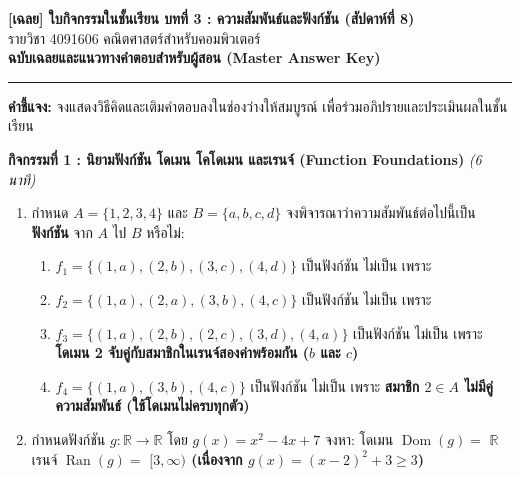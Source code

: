 \documentclass[a4paper,12pt]{article}
\newcommand{\ans}[1]{\textbf{\color{ans}#1}}
\begin{document}
\noindent
\begin{minipage}[c]{0.78\textwidth}
  {\Large\bfseries\color{navy} [เฉลย] ใบกิจกรรมในชั้นเรียน บทที่ 3 : ความสัมพันธ์และฟังก์ชัน (สัปดาห์ที่ 8)}\\[0.1em]
  {\normalsize รายวิชา 4091606 คณิตศาสตร์สำหรับคอมพิวเตอร์}\\[0.5em]
  {\bfseries\color{ans} ฉบับเฉลยและแนวทางคำตอบสำหรับผู้สอน (Master Answer Key)}
\end{minipage}\hfill
\begin{minipage}[c]{0.2\textwidth}
  \centering
\end{minipage}
\par\vspace{0.3em}\hrule\vspace{0.4em}

\noindent\textbf{คำชี้แจง:} จงแสดงวิธีคิดและเติมคำตอบลงในช่องว่างให้สมบูรณ์ เพื่อร่วมอภิปรายและประเมินผลในชั้นเรียน
\vspace{0.3em}

\noindent\textbf{กิจกรรมที่ 1 : นิยามฟังก์ชัน โดเมน โคโดเมน และเรนจ์ (Function Foundations)} \hfill \textit{(6 นาที)}
\begin{enumerate}[label=\arabic*)]
  \item กำหนด $A = \{1, 2, 3, 4\}$ และ $B = \{a, b, c, d\}$ จงพิจารณาว่าความสัมพันธ์ต่อไปนี้เป็น \textbf{ฟังก์ชัน} จาก $A$ ไป $B$ หรือไม่:
        \begin{enumerate}[label=(\alph*),itemsep=1pt]
          \item $f_1 = \{(1, a), (2, b), (3, c), (4, d)\}$ \quad [\ans{\checkmark}] เป็นฟังก์ชัน \quad [ \ ] ไม่เป็น เพราะ \makebox[4cm]{\dotfill}
          \item $f_2 = \{(1, a), (2, a), (3, b), (4, c)\}$ \quad [\ans{\checkmark}] เป็นฟังก์ชัน \quad [ \ ] ไม่เป็น เพราะ \makebox[4cm]{\dotfill}
          \item $f_3 = \{(1, a), (2, b), (2, c), (3, d), (4, a)\}$ \quad [ \ ] เป็นฟังก์ชัน \quad [\ans{\checkmark}] ไม่เป็น เพราะ \ans{โดเมน 2 จับคู่กับสมาชิกในเรนจ์สองค่าพร้อมกัน ($b$ และ $c$)}
          \item $f_4 = \{(1, a), (3, b), (4, c)\}$ \quad [ \ ] เป็นฟังก์ชัน \quad [\ans{\checkmark}] ไม่เป็น เพราะ \ans{สมาชิก $2 \in A$ ไม่มีคู่ความสัมพันธ์ (ใช้โดเมนไม่ครบทุกตัว)}
        \end{enumerate}
  \item กำหนดฟังก์ชัน $g: \mathbb{R} \to \mathbb{R}$ โดย $g(x) = x^2 - 4x + 7$ จงหา:
        \quad โดเมน $\operatorname{Dom}(g) =$ \ans{$\mathbb{R}$}
        \quad เรนจ์ $\operatorname{Ran}(g) =$ \ans{$[3, \infty)$ \quad (เนื่องจาก $g(x) = (x-2)^2 + 3 \ge 3$)}
\end{enumerate}
\vspace{0.2em}
\end{document}
